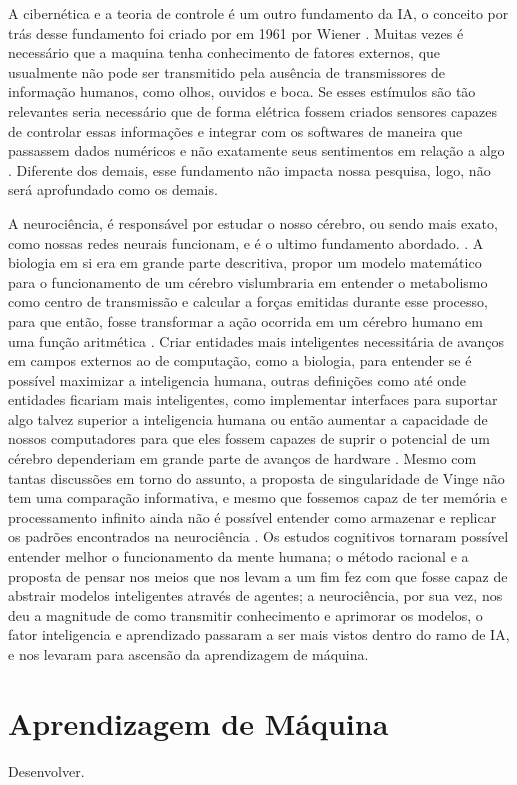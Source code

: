 \documentclass[
	12pt,				%
	openright,			%
	twoside,			%
	a4paper,			%
	english,			%
	french,				%
	spanish,			%
	brazil				%
	]{abntex2}
\begin{document}
A cibernética e a teoria de controle é um outro fundamento da IA, o conceito por trás desse fundamento foi criado por em 1961 por Wiener \cite[15]{russell2003artificial}. Muitas vezes é necessário que a maquina tenha conhecimento de fatores externos, que usualmente não pode ser transmitido pela ausência de transmissores de informação humanos, como olhos, ouvidos e boca. Se esses estímulos são tão relevantes seria necessário que de forma elétrica fossem criados sensores capazes de controlar essas informações e integrar com os softwares de maneira que passassem dados numéricos e não exatamente seus sentimentos em relação a algo \cite[3-7]{wiener1961cybernetics}. Diferente dos demais, esse fundamento não impacta nossa pesquisa, logo, não será aprofundado como os demais.

A neurociência, é responsável por estudar o nosso cérebro, ou sendo mais exato, como nossas redes neurais funcionam, e é o ultimo fundamento abordado. \cite[10]{russell2003artificial}. A biologia em si era em grande parte descritiva, propor um modelo matemático para o funcionamento de um cérebro vislumbraria em entender o metabolismo como centro de transmissão e calcular a forças emitidas durante esse processo, para que então, fosse transformar a ação ocorrida em um cérebro humano em uma função aritmética \cite[1-3]{rashevsky1960mathematical}. Criar entidades mais inteligentes necessitária de avanços em campos externos ao de computação, como a biologia, para entender se é possível maximizar a inteligencia humana, outras definições como até onde entidades ficariam mais inteligentes, como implementar interfaces para suportar algo talvez superior a inteligencia humana ou então aumentar a capacidade de nossos computadores para que eles fossem capazes de suprir o potencial de um cérebro dependeriam em grande parte de avanços de hardware \cite[1-2]{vinge1993coming}. Mesmo com tantas discussões em torno do assunto, a proposta de singularidade de Vinge não tem uma comparação informativa, e mesmo que fossemos capaz de ter memória e processamento infinito ainda não é possível entender como armazenar e replicar os padrões encontrados na neurociência \cite[11-12]{russell2003artificial}. Os estudos cognitivos tornaram possível entender melhor o funcionamento da mente humana; o método racional e a proposta de pensar nos meios que nos levam a um fim fez com que fosse capaz de abstrair modelos inteligentes através de agentes; a neurociência, por sua vez, nos deu a magnitude de como transmitir conhecimento e aprimorar os modelos, o fator inteligencia e aprendizado passaram a ser mais vistos dentro do ramo de IA, e nos levaram para ascensão da aprendizagem de máquina.

\section{Aprendizagem de Máquina}
Desenvolver.

\postextual







\printindex
\end{document}

